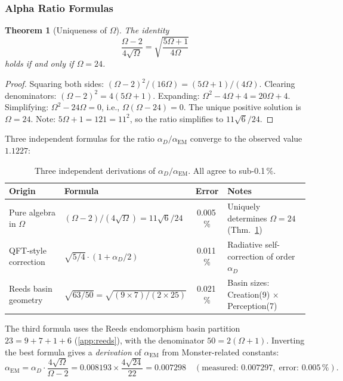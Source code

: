 \documentclass[11pt,a4paper]{article}
\theoremstyle{plain}
\newtheorem{theorem}{Theorem}[section]
\theoremstyle{remark}
\renewcommand{\Omega}{\varOmega}
\begin{document}
\subsubsection{Alpha Ratio Formulas}

\begin{theorem}[Uniqueness of $\Omega$]\label{thm:omega-unique}
The identity
\begin{equation}\label{eq:omega-unique}
  \frac{\Omega-2}{4\sqrt\Omega} = \sqrt{\frac{5\Omega+1}{4\Omega}}
\end{equation}
holds if and only if $\Omega = 24$.
\end{theorem}

\begin{proof}
Squaring both sides: $(\Omega-2)^2/(16\Omega) = (5\Omega+1)/(4\Omega)$.
Clearing denominators: $(\Omega-2)^2 = 4(5\Omega+1)$.
Expanding: $\Omega^2 - 4\Omega + 4 = 20\Omega + 4$.
Simplifying: $\Omega^2 - 24\Omega = 0$, i.e., $\Omega(\Omega-24) = 0$.
The unique positive solution is $\Omega = 24$.
Note: $5\Omega+1 = 121 = 11^2$, so the ratio simplifies to $11\sqrt{6}/24$.
\end{proof}

Three independent formulas for the ratio $\alpha_D/\alpha_{\mathrm{EM}}$
converge to the observed value $1.1227$:

\begin{table}[H]
\centering\small
\begin{tabular}{@{}llcl@{}}
\toprule
Origin & Formula & Error & Notes\\
\midrule
Pure algebra in $\Omega$ &
  $(\Omega{-}2)/(4\sqrt\Omega) = 11\sqrt{6}/24$ & 0.005\,\% &
  Uniquely determines $\Omega=24$ (Thm.~\ref{thm:omega-unique})\\
QFT-style correction &
  $\sqrt{5/4}\cdot(1+\alpha_D/2)$ & 0.011\,\% &
  Radiative self-correction of order $\alpha_D$\\
Reeds basin geometry &
  $\sqrt{63/50} = \sqrt{(9\times 7)/(2\times 25)}$ & 0.021\,\% &
  Basin sizes: Creation(9) $\times$ Perception(7)\\
\bottomrule
\end{tabular}
\caption{Three independent derivations of $\alpha_D/\alpha_{\mathrm{EM}}$.
  All agree to sub-0.1\,\%.}
\label{tab:alpha-formulas}
\end{table}

The third formula uses the Reeds endomorphism basin partition
$23 = 9 + 7 + 1 + 6$ (\cref{app:reeds}), with the denominator
$50 = 2(\Omega+1)$.
Inverting the best formula gives a \emph{derivation} of $\alpha_{\mathrm{EM}}$
from Monster-related constants:
\begin{equation}\label{eq:alpha-derive}
  \alpha_{\mathrm{EM}}
  = \alpha_D \cdot \frac{4\sqrt\Omega}{\Omega - 2}
  = 0.008193 \times \frac{4\sqrt{24}}{22}
  = 0.007298 \quad(\text{measured: }0.007297,\;\text{error: }0.005\,\%).
\end{equation}
\end{document}
